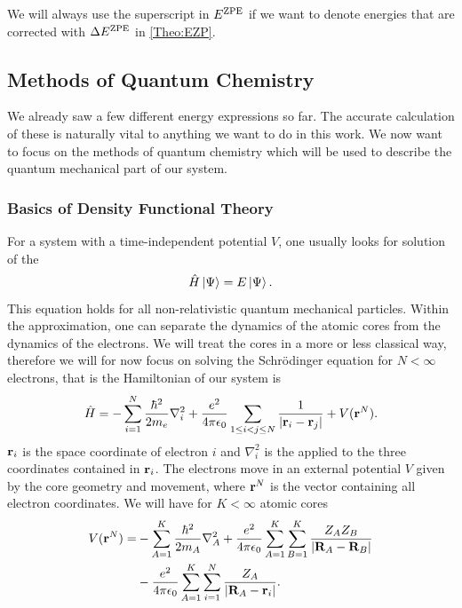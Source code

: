 \documentclass[8.5pt,twoside,twocolumn]{article}
\newcommand\zpe{\enmat{\te{ZPE}}}
\newcommand\ezp{\enmat{E^{\zpe}}}
\renewcommand\r{\bo r}
\theoremstyle{standard}
\begin{document}
We will always use the superscript in $\ezp$ if we want to denote energies that are corrected 
with $\Dl \ezp$ in \eqref{Theo:EZP}.

\subsection{Methods of Quantum Chemistry}
\label{Sec:Theo:QMMet}

We already saw a few different energy expressions so far. The accurate calculation of these 
is naturally vital to anything we want to do in this work. We now want to focus on the methods
of quantum chemistry which will be used to describe the quantum mechanical part of our system.

\subsubsection{Basics of Density Functional Theory}
For a system with a time-independent potential $V$, one usually looks for solution of the 
\begin{equation}
 \hat{H} \left|\Psi{}\right\rangle = E \left|\Psi{}\right\rangle.
 \label{Theo:Schroedinger}
\end{equation}
This equation holds for all non-relativistic quantum mechanical particles. Within the 
approximation, one can separate the dynamics of the atomic cores from the dynamics of the electrons. We will treat
the cores in a more or less classical way, therefore we will for now focus on solving the Schrödinger 
equation for $N < \infty$ electrons, that is the Hamiltonian of our system is
\begin{equation}
 \Ha = -\sum_{i=1}^N \frac{\hbar^2}{2m_e} \nabla_i^2 + \frac {e^2} {4 \pi \e_0} \sum_{1\le i < j \le N} \frac 1 {\abs{\r_i - \r_j}} + V(\r^N).
 \label{Theo:Hamiltonian}
\end{equation}
$\r_i$ is the space coordinate of electron $i$ and $\nabla_i^2$ is the  applied to the three coordinates contained in $\r_i$. 
The electrons move in an external potential $V$ given by the core geometry and movement, where $\r^N$ is the vector containing
all electron coordinates. We will have for $K < \infty$ atomic cores 
\begin{equation}
\begin{aligned}
V(\r^N)=&-\sum_{A=1}^K \frac{\hbar^2}{2m_A} \nabla_A^2 + \frac {e^2} {4 \pi \e_0} \sum_{A=1}^K \sum_{B=1}^K \frac {Z_A Z_B} {\abs{\bo R_A - \bo R_B}} \\
   &- \frac {e^2} {4 \pi \e_0} \sum_{A=1}^K \sum_{i=1}^N \frac {Z_A} {\abs{\bo R_A - \r_i}}. 
\end{aligned}
\label{Theo:CorePotential}
\end{equation}
\end{document}
